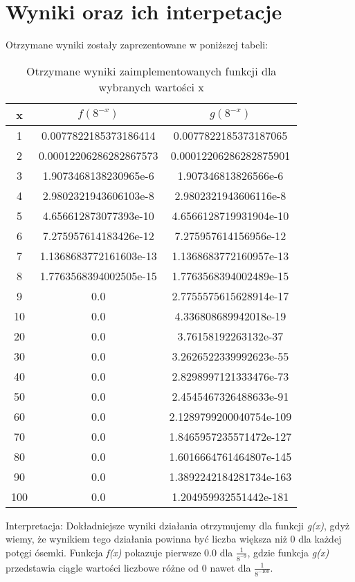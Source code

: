 \documentclass[a4paper,14pt]{report}
\begin{document}
\section{Wyniki oraz ich interpetacje}
Otrzymane wyniki zostały zaprezentowane w poniższej tabeli:
\begin{table}[h!]
\centering
\begin{tabular}{|c | c | c |} 
 \hline
 x & $f(8^{-x})$ & $g(8^{-x})$ \\ [0.5ex] 
 \hline\hline
 1 & 0.0077822185373186414 & 0.0077822185373187065 \\ 
 2 & 0.00012206286282867573 & 0.00012206286282875901 \\
 3 & 1.9073468138230965e-6 & 1.907346813826566e-6 \\
 4 & 2.9802321943606103e-8 & 2.9802321943606116e-8 \\
 5 & 4.656612873077393e-10 & 4.6566128719931904e-10 \\
 6 & 7.275957614183426e-12 & 7.275957614156956e-12 \\
 7 & 1.1368683772161603e-13 & 1.1368683772160957e-13 \\
 8 & 1.7763568394002505e-15 & 1.7763568394002489e-15 \\
 9 & 0.0 & 2.7755575615628914e-17 \\
 10 & 0.0 & 4.336808689942018e-19 \\
 20 & 0.0 & 3.76158192263132e-37 \\
 30 & 0.0 & 3.2626522339992623e-55 \\
 40 & 0.0 & 2.8298997121333476e-73 \\
 50 & 0.0 & 2.4545467326488633e-91 \\
 60 & 0.0 & 2.1289799200040754e-109 \\
 70 & 0.0 & 1.8465957235571472e-127 \\
 80 & 0.0 & 1.6016664761464807e-145 \\
 90 & 0.0 & 1.3892242184281734e-163 \\
 100 & 0.0 & 1.204959932551442e-181 \\
 \hline
\end{tabular}
\caption{Otrzymane wyniki zaimplementowanych funkcji dla wybranych wartości x}
\label{Zad6Wyniki}
\end{table}
Interpretacja: Dokładniejsze wyniki działania otrzymujemy dla funkcji \textit{g(x)}, gdyż wiemy, że wynikiem tego działania powinna być liczba większa niż 0 dla każdej potęgi ósemki. Funkcja \textit{f(x)} pokazuje pierwsze 0.0 dla $ \frac{1}{8^{-9}} $, gdzie funkcja \textit{g(x)} przedstawia ciągle wartości liczbowe różne od 0 nawet dla $ \frac{1}{8^{-100}} $. \\
\end{document}
